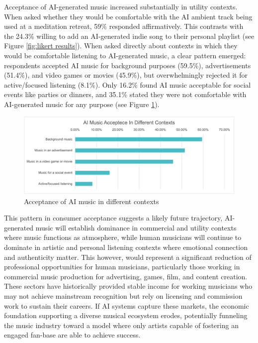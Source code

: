\documentclass{article}
\begin{document}
Acceptance of AI-generated music increased substantially in utility contexts. When asked whether they would be comfortable with the AI ambient track being used at a meditation retreat, 59\% responded affirmatively. This contrasts with the 24.3\% willing to add an AI-generated indie song to their personal playlist (see Figure \ref{fig:likert results}). When asked directly about contexts in which they would be comfortable listening to AI-generated music, a clear pattern emerged: respondents accepted AI music for background purposes (59.5\%), advertisements (51.4\%), and video games or movies (45.9\%), but overwhelmingly rejected it for active/focused listening (8.1\%). Only 16.2\% found AI music acceptable for social events like parties or dinners, and 35.1\% stated they were not comfortable with AI-generated music for any purpose (see Figure \ref{fig:acceptance}).

\begin{figure}[h]
    \centering
    \includegraphics[width=1\textwidth]{Acceptance in context.png}
    \caption{Acceptance of AI music in different contexts}
    \label{fig:acceptance}
\end{figure}

This pattern in consumer acceptance suggests a likely future trajectory, AI-generated music will establish dominance in commercial and utility contexts where music functions as atmosphere, while human musicians will continue to dominate in artistic and personal listening contexts where emotional connection and authenticity matter. This however, would represent a significant reduction of professional opportunities for human musicians, particularly those working in commercial music production for advertising, games, film, and content creation. These sectors have historically provided stable income for working musicians who may not achieve mainstream recognition but rely on licensing and commission work to sustain their careers. If AI systems capture these markets, the economic foundation supporting a diverse musical ecosystem erodes, potentially funneling the music industry toward a model where only artists capable of fostering an engaged fan-base are able to achieve success.
\end{document}
